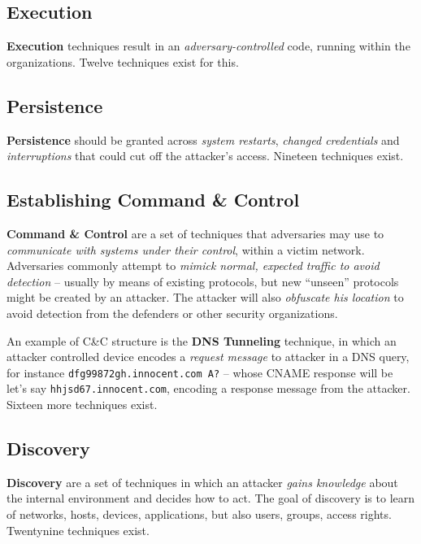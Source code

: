 \documentclass[10pt]{extbook}
\begin{document}
\subsection{Execution}

\textbf{Execution} techniques result in an \emph{adversary\--controlled} code,
running within the organizations. Twelve techniques exist for this.

\subsection{Persistence}

\textbf{Persistence} should be granted across \emph{system restarts},
\emph{changed credentials} and \emph{interruptions} that could cut off the
attacker's access. Nineteen techniques exist.

\subsection{Establishing Command \& Control}

\textbf{Command \& Control} are a set of techniques that adversaries may use
to \emph{communicate with systems under their control}, within a victim
network. Adversaries commonly attempt to \emph{mimick normal, expected traffic
to avoid detection} -- usually by means of existing protocols, but new
``unseen'' protocols might be created by an attacker. The attacker will also
\emph{obfuscate his location} to avoid detection from the defenders or other
security organizations.

An example of C\&C structure is the \textbf{DNS Tunneling} technique, in which
an attacker controlled device encodes a \emph{request message} to attacker in a
DNS query, for instance \texttt{dfg99872gh\-.innocent.com A?} -- whose CNAME
response will be let's say \texttt{hhjsd67\-.innocent.com}, encoding a response
message from the attacker. Sixteen more techniques exist.

\subsection{Discovery}

\textbf{Discovery} are a set of techniques in which an attacker \emph{gains
knowledge} about the internal environment and decides how to act. The goal of
discovery is to learn of networks, hosts, devices, applications, but also
users, groups, access rights. Twentynine techniques exist.
\end{document}
